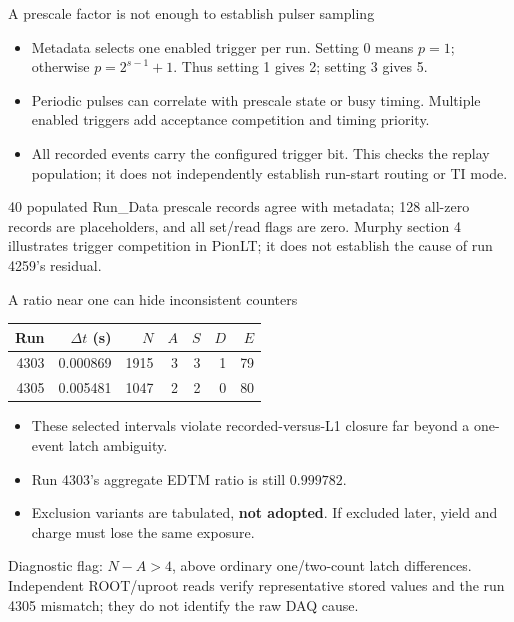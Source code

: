 \documentclass[aspectratio=169,11pt]{beamer}
\newcommand{\source}[1]{\par\vfill{\scriptsize\color{muted}#1\par}}
\begin{document}
\begin{frame}{A prescale factor is not enough to establish pulser sampling}
\begin{itemize}\setlength\itemsep{3mm}
\item Metadata selects one enabled trigger per run. Setting 0 means $p=1$; otherwise $p=2^{s-1}+1$. Thus setting 1 gives 2; setting 3 gives 5.
\item Periodic pulses can correlate with prescale state or busy timing. Multiple enabled triggers add acceptance competition and timing priority.
\item All recorded events carry the configured trigger bit. This checks the replay population; it does not independently establish run-start routing or TI mode.
\end{itemize}
\source{40 populated Run\_Data prescale records agree with metadata; 128 all-zero records are placeholders, and all set/read flags are zero. Murphy section 4 illustrates trigger competition in PionLT; it does not establish the cause of run 4259's residual.}
\end{frame}

\begin{frame}{A ratio near one can hide inconsistent counters}
\small\renewcommand{\arraystretch}{1.3}
\begin{tabular}{rrrrrrr}\toprule
Run & $\Delta t$ (s) & $N$ & $A$ & $S$ & $D$ & $E$\\\midrule
4303 & 0.000869 & 1915 & 3 & 3 & 1 & 79\\
4305 & 0.005481 & 1047 & 2 & 2 & 0 & 80\\\bottomrule
\end{tabular}
\vspace{4mm}
\begin{itemize}\setlength\itemsep{2mm}
\item These selected intervals violate recorded-versus-L1 closure far beyond a one-event latch ambiguity.
\item Run 4303's aggregate EDTM ratio is still $0.999782$.
\item Exclusion variants are tabulated, \textbf{not adopted}. If excluded later, yield and charge must lose the same exposure.
\end{itemize}
\source{Diagnostic flag: $N-A>4$, above ordinary one/two-count latch differences. Independent ROOT/uproot reads verify representative stored values and the run 4305 mismatch; they do not identify the raw DAQ cause.}
\end{frame}
\end{document}
